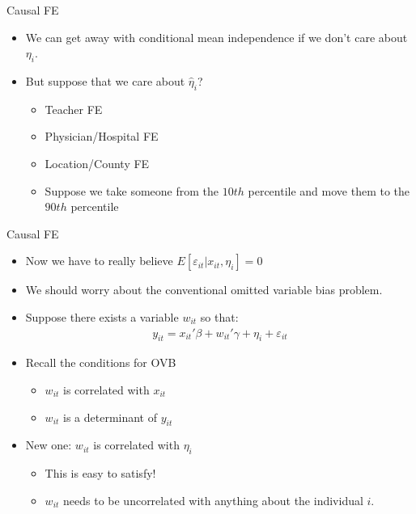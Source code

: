 \documentclass[aspectratio=169]{beamer}
\begin{document}
\begin{frame}{Causal FE}
\begin{itemize}
\item We can get away with conditional mean independence if we don't care about $\eta_i$.
\item But suppose that we care about $\widehat{\eta}_i$?
\begin{itemize}
\item Teacher FE
\item Physician/Hospital FE
\item Location/County FE
\item Suppose we take someone from the $10th$ percentile and move them to the $90th$ percentile
\end{itemize}
\end{itemize}
\end{frame}


\begin{frame}{Causal FE}
\begin{itemize}
\item Now we have to really believe $E[ \varepsilon_{it} | x_{it}, \eta_i]=0$
\item We should worry about the conventional \alert{omitted variable bias} problem.
\item Suppose there exists a variable $w_{it}$ so that:
\begin{eqnarray*}
y_{it} =  x_{it}'\beta +  w_{it}'\gamma + \eta_i + \varepsilon_{it}
\end{eqnarray*}
\item Recall the conditions for OVB
\begin{itemize}
\item $w_{it}$ is correlated with $x_{it}$
\item $w_{it}$ is a determinant of $y_{it}$
\end{itemize}
\item New one:  $w_{it}$ is correlated with $\eta_i$
\begin{itemize}
\item This is easy to satisfy!
\item $w_{it}$ needs to be uncorrelated with anything about the individual $i$.
\end{itemize}
\end{itemize}
\end{frame}
\end{document}
